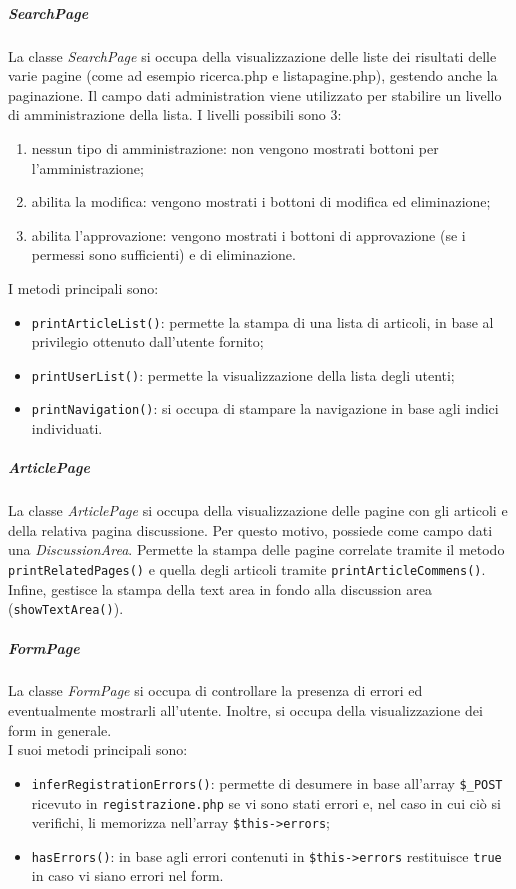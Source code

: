 \subparagraph{SearchPage}
La classe \textit{SearchPage} si occupa della visualizzazione delle liste dei risultati delle varie pagine (come ad esempio ricerca.php e listapagine.php), gestendo anche la paginazione. Il campo dati administration viene utilizzato per stabilire un livello di amministrazione della lista. I livelli possibili sono 3:
\begin{enumerate}[start=0, label=\arabic*$\rightarrow$]
	\item nessun tipo di amministrazione: non vengono mostrati bottoni per l'amministrazione;
	\item abilita la modifica: vengono mostrati i bottoni di modifica ed eliminazione;
	\item abilita l'approvazione: vengono mostrati i bottoni di approvazione (se i permessi sono sufficienti) e di eliminazione.
\end{enumerate}
I metodi principali sono:
\begin{itemize}
	\item \texttt{printArticleList()}: permette la stampa di una lista di articoli, in base al privilegio ottenuto dall'utente fornito;
	\item \texttt{printUserList()}: permette la visualizzazione della lista degli utenti;
	\item \texttt{printNavigation()}: si occupa di stampare la navigazione in base agli indici individuati.
\end{itemize}

\subparagraph{ArticlePage}
La classe \textit{ArticlePage} si occupa della visualizzazione delle pagine con gli articoli e della relativa pagina discussione. Per questo motivo, possiede come campo dati una \textit{DiscussionArea}. Permette la stampa delle pagine correlate tramite il metodo \texttt{printRelatedPages()} e quella degli articoli tramite \texttt{printArticleCommens()}. Infine, gestisce la stampa della text area in fondo alla discussion area (\texttt{showTextArea()}).

\subparagraph{FormPage}
La classe \textit{FormPage} si occupa di controllare la presenza di errori ed eventualmente mostrarli all'utente. Inoltre, si occupa della visualizzazione dei form in generale.\\
I suoi metodi principali sono:
\begin{itemize}
	\item \texttt{inferRegistrationErrors()}: permette di desumere in base all'array \texttt{\$\_POST} ricevuto in \texttt{registrazione.php} se vi sono stati errori e, nel caso in cui ciò si verifichi, li memorizza nell'array \texttt{\$this->errors};
	\item \texttt{hasErrors()}: in base agli errori contenuti in \texttt{\$this->errors} restituisce \texttt{true} in caso vi siano errori nel form. 
\end{itemize}


